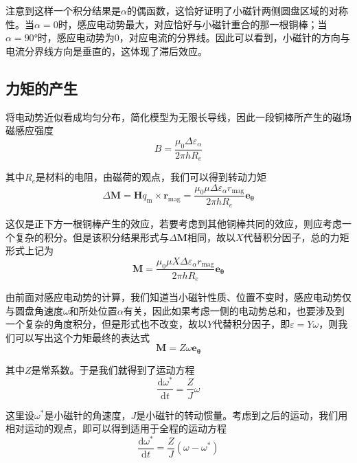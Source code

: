 \documentclass{CLGPY}
\begin{document}
\begin{multicols}{1}
注意到这样一个积分结果是$\alpha$的偶函数，这恰好证明了小磁针两侧圆盘区域的对称性。当$\alpha=0$时，感应电动势最大，对应恰好与小磁针重合的那一根铜棒；当$\alpha=90$°时，感应电动势为0，对应电流的分界线。因此可以看到，小磁针的方向与电流分界线方向是垂直的，这体现了滞后效应。

\subsection{力矩的产生}
将电动势近似看成均匀分布，简化模型为无限长导线，因此一段铜棒所产生的磁场磁感应强度
\begin{equation}
B=\frac{\mu_{0} \Delta \varepsilon_{\alpha}}{2 \pi h R_{e}}
\end{equation}

其中$R_e$是材料的电阻，由磁荷的观点，我们可以得到转动力矩
\begin{equation}
\Delta\boldsymbol{M}=\boldsymbol{H} q_{\mathrm{m}} \times \boldsymbol{r}_{\mathrm{mag}}=\frac{\mu_{0} \mu \Delta \varepsilon_{\alpha} r_{\mathrm{mag}}}{2 \pi h R_{e}} \boldsymbol{e}_{\boldsymbol{\theta}}
\end{equation}

这仅是正下方一根铜棒产生的效应，若要考虑到其他铜棒共同的效应，则应考虑一个复杂的积分。但是该积分结果形式与$\Delta\bm{M}$相同，故以$X$代替积分因子，总的力矩形式上记为
\begin{equation}
\boldsymbol{M}=\frac{\mu_{0} \mu X\Delta \varepsilon_{\alpha} r_{\mathrm{mag}}}{2 \pi h R_{e}} \boldsymbol{e}_{\boldsymbol{\theta}}
\end{equation}

由前面对感应电动势的计算，我们知道当小磁针性质、位置不变时，感应电动势仅与圆盘角速度$\omega$和所处位置$\alpha$有关，因此如果考虑一侧的电动势总和，也要涉及到一个复杂的角度积分，但是形式也不改变，故以$Y$代替积分因子，即$\varepsilon=Y\omega$，则我们可以写出这个力矩最终的表达式
\begin{equation}
\bm{M}=Z\omega \bm{e_\theta}
\end{equation}

其中$Z$是常系数。于是我们就得到了运动方程
\begin{equation}
\frac{\text{d}\omega^*}{\text{d}t}=\frac{Z}{J}\omega
\end{equation}

这里设$\omega^*$是小磁针的角速度，$J$是小磁针的转动惯量。考虑到之后的运动，我们用相对运动的观点，即可以得到适用于全程的运动方程
\begin{equation}
\frac{\text{d}\omega^*}{\text{d}t}=\frac{Z}{J}(\omega-\omega^*)
\end{equation}


\end{multicols}
\end{document}
